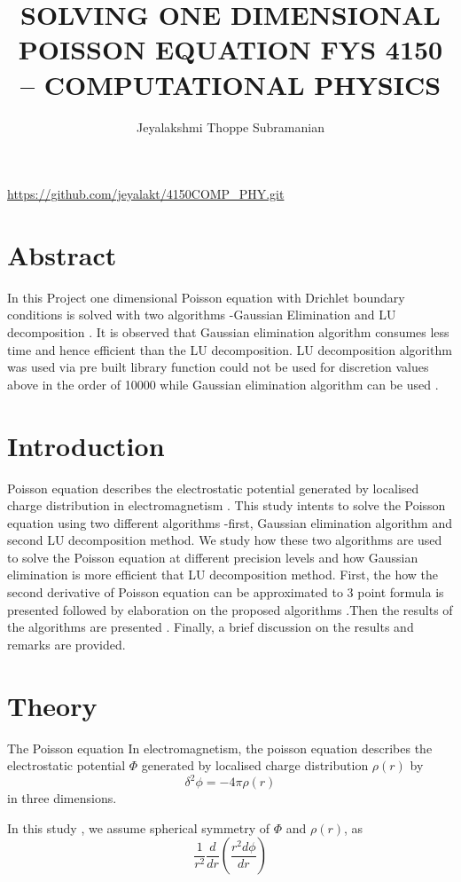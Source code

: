 \documentclass{article}
\title{SOLVING ONE DIMENSIONAL POISSON EQUATION
FYS 4150 – COMPUTATIONAL PHYSICS
}
\author{Jeyalakshmi Thoppe Subramanian }
\begin{document}
\maketitle
\url{https://github.com/jeyalakt/4150COMP_PHY.git}
\section{Abstract}
In this Project one dimensional Poisson equation with Drichlet boundary conditions is solved with two algorithms -Gaussian Elimination and LU decomposition . It is observed that Gaussian elimination algorithm consumes less time and hence efficient than the LU decomposition. LU decomposition algorithm was used via pre built library function could not be used  for discretion values above in the order of 10000 while Gaussian elimination algorithm can be used .

\section{Introduction}
Poisson equation describes the electrostatic potential generated by localised charge distribution in electromagnetism  . This study intents  to solve  the Poisson equation using two different algorithms -first,  Gaussian elimination algorithm and second LU decomposition method.
We study how these two algorithms are used to solve the Poisson equation at different precision levels and how Gaussian elimination is more efficient that LU decomposition method.
First, the how the second derivative of  Poisson equation  can be approximated to 3 point formula is presented followed by elaboration on the proposed algorithms .Then the results of the algorithms are presented . Finally, a brief discussion on the results and remarks are provided.
\section{Theory}
The Poisson equation 
In electromagnetism, the poisson equation describes the electrostatic potential $\Phi$ generated by localised charge distribution $\rho(r)$
by 
\begin{equation}
\delta^2 \phi = -4\pi\rho(r)\label{1}
\end{equation}
in three dimensions.

In this study , we assume spherical symmetry of $\Phi$ and $\rho(r)$, as
\begin{equation}
\frac{1}{r^2}\frac{d}{dr}(\frac{r^2 d\phi}{dr})
\end{equation}
\end{document}
